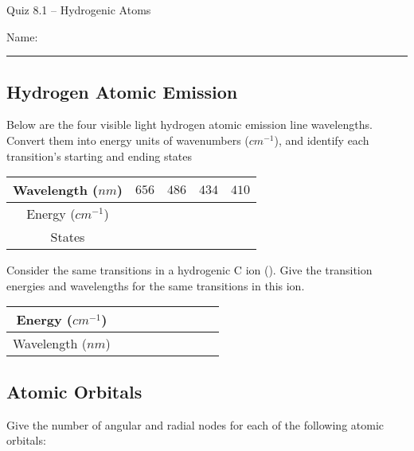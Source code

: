 \documentclass[11pt, letterpaper]{memoir}
\begin{document}
\begin{center}
	{\large Quiz 8.1 --	Hydrogenic Atoms}
\end{center}
{\large Name: \rule[-1mm]{4in}{.1pt}

\subsection*{Hydrogen Atomic Emission}

Below are the four visible light hydrogen atomic emission line wavelengths. Convert them into energy units of wavenumbers ($cm^{-1}$), and identify each transition's starting and ending states

\begin{tabular}{c|c|c|c|c}
	Wavelength ($nm$)  & $656$          & $486$          & $434$          & $410$          \\ \midrule
	Energy ($cm^{-1}$) & ~\hspace{5em}~ & ~\hspace{5em}~ & ~\hspace{5em}~ & ~\hspace{5em}~ \\ \midrule
	States             & ~\hspace{5em}~ & ~\hspace{5em}~ & ~\hspace{5em}~ & ~\hspace{5em}~
\end{tabular}

\noindent
Consider the same transitions in a hydrogenic C ion (). Give the transition energies and wavelengths for the same transitions in this ion.

\begin{tabular}{c|c|c|c|c}
	Energy ($cm^{-1}$) &                &                &                &                \\ \midrule
	Wavelength ($nm$)  & ~\hspace{5em}~ & ~\hspace{5em}~ & ~\hspace{5em}~ & ~\hspace{5em}~
\end{tabular}

\vspace{2em}
\subsection*{Atomic Orbitals}

Give the number of angular and radial nodes for each of the following atomic orbitals:

}
\end{document}
